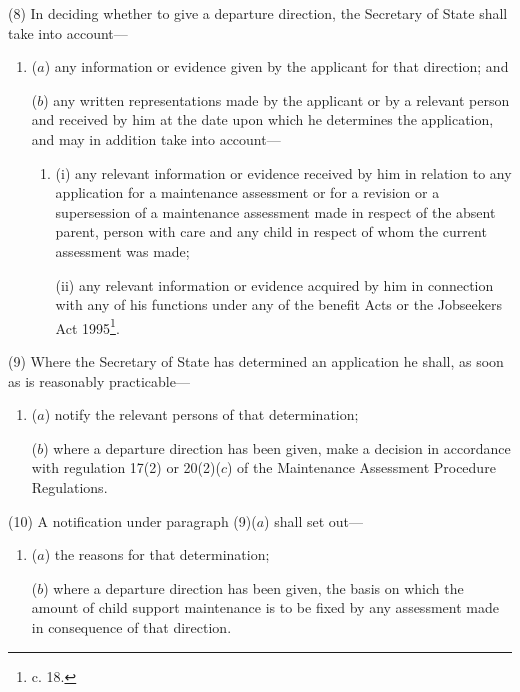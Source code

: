 \documentclass[12pt,a4paper]{article}
\begin{document}
(8) In deciding whether to give a departure direction, the Secretary of State
shall take into account—
\begin{enumerate}\item[]
($a$) any information or evidence given by the applicant for that direction; and

($b$) any written representations made by the applicant or by a relevant person and
received by him at the date upon which he determines the application, and may in
addition take into account—
\begin{enumerate}\item[]
(i) any relevant information or evidence received by him 
in relation to any application for a maintenance assessment or 
for a revision or a supersession of  %
a maintenance assessment made in respect of the absent parent, person with care and any child in respect of whom the current assessment was made;

(ii) any relevant information or evidence acquired by him in connection with any
of his functions under any of the benefit Acts or the Jobseekers Act 1995\footnote{ c. 18.}.
\end{enumerate}
\end{enumerate}

(9) Where the Secretary of State has determined an application he shall, as soon
as is reasonably practicable—
\begin{enumerate}\item[]
($a$) notify the relevant persons of that determination;

($b$) where a departure direction has been given, 
make a decision in accordance with regulation 17(2) or 20(2)($c$) of the Maintenance Assessment Procedure Regulations.  %
\end{enumerate}

(10) A notification under paragraph (9)($a$) shall set out—
\begin{enumerate}\item[]
($a$) the reasons for that determination;

($b$) where a departure direction has been given, the basis on which the amount of
child support maintenance is to be fixed by any assessment made in consequence
of that direction.
\end{enumerate}
\end{document}
